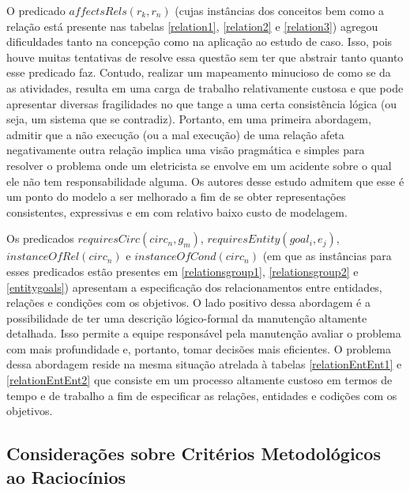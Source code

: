 O predicado $affectsRels(r_k,r_n)$ (cujas instâncias dos conceitos bem como a relação está presente nas tabelas \ref{relation1}, \ref{relation2} e \ref{relation3}) agregou dificuldades tanto na concepção como na aplicação ao estudo de caso. Isso, pois houve muitas tentativas de resolve essa questão sem ter que abstrair tanto quanto esse predicado faz. Contudo, realizar um mapeamento minucioso de como se da as atividades, resulta em uma carga de trabalho relativamente custosa e que pode apresentar diversas fragilidades no que tange a uma certa consistência lógica (ou seja, um sistema que se contradiz). Portanto, em uma primeira abordagem, admitir que a não execução (ou a mal execução) de uma relação afeta negativamente outra relação implica uma visão pragmática e simples para resolver o problema onde um eletricista se envolve em um acidente sobre o qual ele não tem responsabilidade alguma. Os autores desse estudo admitem que esse é um ponto do modelo a ser melhorado a fim de se obter representações consistentes, expressivas e em com relativo baixo custo de modelagem. 

Os predicados $requiresCirc(circ_n,g_m)$, $requiresEntity(goal_i, e_j)$, $instanceOfRel(circ_n)$ e $instanceOfCond(circ_n)$ (em que as instâncias para esses predicados estão presentes em \ref{relationsgroup1}, \ref{relationsgroup2} e \ref{entitygoals}) apresentam a especificação dos relacionamentos entre entidades, relações e condições com os objetivos. O lado positivo dessa abordagem é a possibilidade de ter uma descrição lógico-formal da manutenção altamente detalhada. Isso permite a equipe responsável pela manutenção avaliar o problema com mais profundidade e, portanto, tomar decisões mais eficientes. O problema dessa abordagem reside na mesma situação atrelada à tabelas \ref{relationEntEnt1} e \ref{relationEntEnt2} que consiste em um processo altamente custoso em termos de tempo e de trabalho a fim de especificar as relações, entidades e codições com os objetivos. 

\subsection{Considerações sobre Critérios Metodológicos ao Raciocínios} \label{conscritmetrac}

